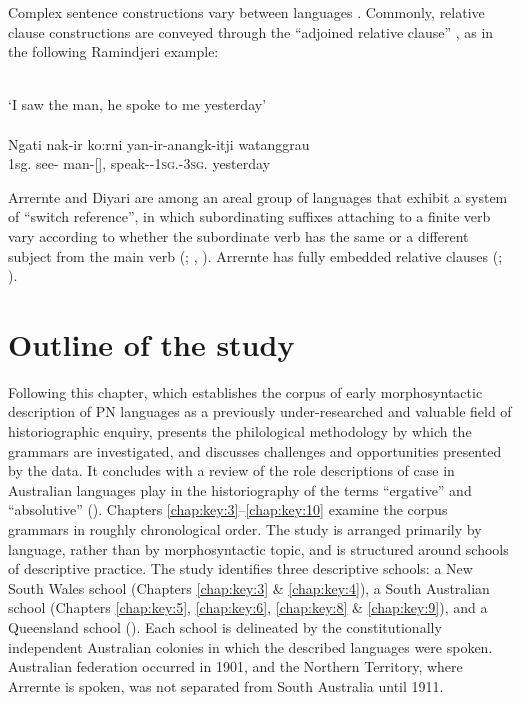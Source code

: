 Complex sentence constructions vary between languages \citep{nordlinger_constituency_2014}. Commonly, relative clause constructions are conveyed through the “adjoined relative clause” \citep{hale_1976}, as in the following Ramindjeri example: 

\ea
{} \\
{`I saw the man, he spoke to me yesterday'} \\
\glt \citep[33]{meyer_vocabulary_1843} \\
\gll Ngati nak-ir ko:rni yan-ir-anangk-itji watanggrau \\
1sg. see- man-[], speak--1\textsc{sg}.-3\textsc{sg}. yesterday \\
\z

Arrernte and Diyari are among an areal group of languages that exhibit a system of ``switch reference'', in which subordinating suffixes attaching to a finite verb vary according to whether the subordinate verb has the same or a different subject from the main verb (\citealt{austin_notitle_1981}; , ). Arrernte has fully embedded relative clauses (\citealt[414--423]{wilkins_mparntwe_1989}; ).

\section{Outline of the study}
\label{sec:key:1.3}

Following this chapter, which establishes the corpus of early morphosyntactic description of PN languages as a previously under-researched and valuable field of historiographic enquiry,  presents the philological methodology by which the grammars are investigated, and discusses challenges and opportunities presented by the data. It concludes with a review of the role descriptions of case in Australian languages play in the historiography of the terms “ergative” and “absolutive” (). Chapters \ref{chap:key:3}–\ref{chap:key:10} examine the corpus grammars in roughly chronological order. The study is arranged primarily by language, rather than by morphosyntactic topic, and is structured around schools of descriptive practice. The study identifies three descriptive schools: a New South Wales school (Chapters \ref{chap:key:3} \& \ref{chap:key:4}), a South Australian school (Chapters \ref{chap:key:5}, \ref{chap:key:6}, \ref{chap:key:8} \& \ref{chap:key:9}), and a Queensland school (). Each school is delineated by the constitutionally independent Australian colonies in which the described languages were spoken. Australian federation occurred in 1901, and the Northern Territory, where Arrernte is spoken, was not separated from South Australia until 1911.

